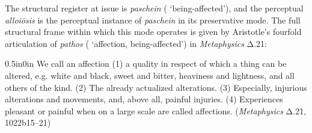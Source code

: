 The structural register at issue is \textit{paschein} ( `being-affected'), and the perceptual \textit{alloiōsis} is the perceptual instance of \textit{paschein} in its preservative mode. The full structural frame within which this mode operates is given by Aristotle's fourfold articulation of \textit{pathos} ( `affection, being-affected') in \textit{Metaphysics} Δ.21:
\begin{adjustwidth}{0.5in}{0in}
We call an affection (1) a quality in respect of which a thing can be altered, e.g. white and black, sweet and bitter, heaviness and lightness, and all others of the kind. (2) The already actualized alterations. (3) Especially, injurious alterations and movements, and, above all, painful injuries. (4) Experiences pleasant or painful when on a large scale are called affections. (\textit{Metaphysics} Δ.21, 1022b15--21)
\end{adjustwidth}
